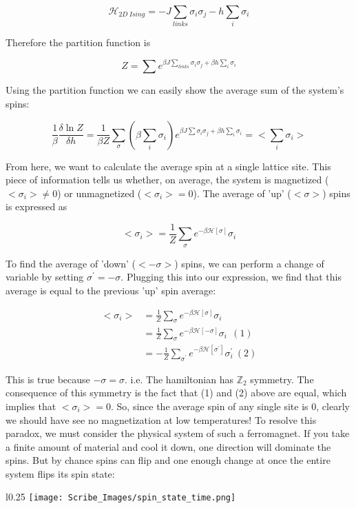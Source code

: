 \documentclass{article}
\newcommand{\pardif}[2]{\frac{\delta#1}{\delta#2}}
\newcommand{\sigi}{\sigma_{i}}
\newcommand{\sigj}{\sigma_{j}}
\begin{document}
$$\mathcal{H}_{2D\ Ising}=-J\sum_{links}\sigma_{i}\sigma_{j}-h\sum_{i}\sigma_{i}$$

Therefore the partition function is 

$$Z=\sum e^{\beta J\sum_{links}\sigi\sigj+\beta h\sum_{i}\sigi}$$

Using the partition function we can easily show the average sum of the system's spins:

$$\frac{1}{\beta}\pardif{\ln{Z}}{h}=\frac{1}{\beta Z}\sum_{\sigma}(\beta\sum_{i}\sigi)e^{\beta J\sum\sigi\sigj+\beta h\sum_{i}\sigi}=<\sum_{i}\sigi>$$

From here, we want to calculate the average spin at a single lattice site.  This piece of information tells us whether, on average, the system is magnetized ($<\sigi>\neq0$) or unmagnetized ($<\sigi>=0$).  The average of 'up' ($<\sigma>$) spins is expressed as

$$<\sigi>=\frac{1}{Z}\sum_{\sigma}e^{-\beta\mathcal{H}[\sigma]}\sigi$$

To find the average of 'down' ($<-\sigma>$) spins, we can perform a change of variable by setting $\sigma^{'}=-\sigma$.  Plugging this into our expression, we find that this average is equal to the previous 'up' spin average:

\begin{equation*}
\begin{split}
	<\sigi> & =\frac{1}{Z}\sum_{\sigma}e^{-\beta\mathcal{H}[\sigma]}\sigi \\
			   & =\frac{1}{Z}\sum_{\sigma}e^{-\beta\mathcal{H}[-\sigma]}\sigi\ \ (1)\\
			   & =-\frac{1}{Z}\sum_{\sigma^{'}}e^{-\beta\mathcal{H}[\sigma^{'}]}\sigi^{'}\ (2)
\end{split}
\end{equation*}

This is true because $\mathcal{-\sigma}=\mathcal{\sigma}$.  i.e. The hamiltonian has $\mathbb{Z}_{2}$ symmetry.  The consequence of this symmetry is the fact that (1) and (2) above are equal, which implies that $<\sigi>=0$.  So, since the average spin of any single site is 0, clearly we should have see no magnetization at low temperatures!  To resolve this paradox, we must consider the physical system of such a ferromagnet.  If you take a finite amount of material and cool it down, one direction will dominate the spins.  But by chance spins can flip and one enough change at once the entire system flips its spin state:

\begin{wrapfigure}{l}{0.25\textwidth}
	\centering
	\texttt{[image: Scribe\_Images/spin\_state\_time.png]}
\end{wrapfigure}
\end{document}

